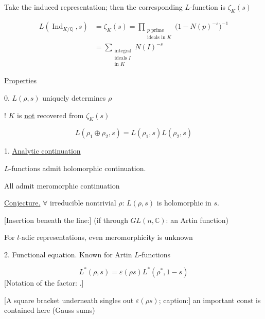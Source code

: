 Take the induced representation; then the corresponding $L$-function is $\zeta_K(s)$

\begin{equation*}
\begin{aligned}
L(\operatorname{Ind}_{K/\mathbb{Q}},s)
&=\zeta_K(s)
=\prod_{\substack{p\text{ prime}\\\text{ideals in }K}}
\bigl(1-N(p)^{-s}\bigr)^{-1}\\
&=\sum_{\substack{\text{integral}\\\text{ideals }I\\\text{in }K}}N(I)^{-s}
\end{aligned}
\end{equation*}

\underline{Properties}

0. $L(\rho,s)$ uniquely determines $\rho$

! $K$ is \underline{\underline{not}} recovered from $\zeta_K(s)$

\begin{equation*}
L(\rho_1\oplus\rho_2,s)=L(\rho_1,s)L(\rho_2,s)
\end{equation*}

1. \underline{Analytic continuation}

$L$-functions 
admit holomorphic continuation.

All admit meromorphic continuation

\underline{Conjecture.} $\forall$ irreducible nontrivial $\rho$:
$L(\rho,s)$ is holomorphic in $s$.

[Insertion beneath the line:]
(if 
through $GL(n,\mathbb{C})$: an Artin function)

For $l$-adic representations, even meromorphicity is unknown

2. Functional equation. Known for Artin $L$-functions

\begin{equation*}
L^*(\rho,s)=\varepsilon(\rho s)L^*(\rho^*,1-s)
\end{equation*}
[Notation of the factor:
.]

[A square bracket underneath singles out $\varepsilon(\rho s)$; caption:]
an important $\mathrm{const}$ is contained here
(Gauss sums)

